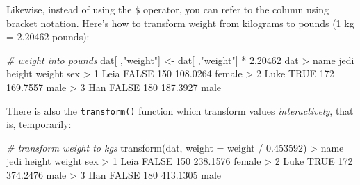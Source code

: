 \documentclass[
]{book}
\newenvironment{Shaded}{\begin{snugshade}}{\end{snugshade}}
\newcommand{\AttributeTok}[1]{\textcolor[rgb]{0.77,0.63,0.00}{#1}}
\newcommand{\CommentTok}[1]{\textcolor[rgb]{0.56,0.35,0.01}{\textit{#1}}}
\newcommand{\ConstantTok}[1]{\textcolor[rgb]{0.00,0.00,0.00}{#1}}
\newcommand{\DecValTok}[1]{\textcolor[rgb]{0.00,0.00,0.81}{#1}}
\newcommand{\FloatTok}[1]{\textcolor[rgb]{0.00,0.00,0.81}{#1}}
\newcommand{\FunctionTok}[1]{\textcolor[rgb]{0.00,0.00,0.00}{#1}}
\newcommand{\NormalTok}[1]{#1}
\newcommand{\OtherTok}[1]{\textcolor[rgb]{0.56,0.35,0.01}{#1}}
\newcommand{\SpecialCharTok}[1]{\textcolor[rgb]{0.00,0.00,0.00}{#1}}
\newcommand{\StringTok}[1]{\textcolor[rgb]{0.31,0.60,0.02}{#1}}
\begin{document}
\begin{Shaded}
\end{Shaded}

Likewise, instead of using the \texttt{\$} operator, you can refer to the column using
bracket notation. Here's how to transform weight from kilograms to pounds
(1 kg = 2.20462 pounds):

\begin{Shaded}
\begin{Highlighting}[]
\CommentTok{\# weight into pounds}
\NormalTok{dat[ ,}\StringTok{"weight"}\NormalTok{] }\OtherTok{\textless{}{-}}\NormalTok{ dat[ ,}\StringTok{"weight"}\NormalTok{] }\SpecialCharTok{*} \FloatTok{2.20462}
\NormalTok{dat}
\SpecialCharTok{\textgreater{}}\NormalTok{   name  jedi height   weight    sex}
\SpecialCharTok{\textgreater{}} \DecValTok{1}\NormalTok{ Leia }\ConstantTok{FALSE}    \DecValTok{150} \FloatTok{108.0264}\NormalTok{ female}
\SpecialCharTok{\textgreater{}} \DecValTok{2}\NormalTok{ Luke  }\ConstantTok{TRUE}    \DecValTok{172} \FloatTok{169.7557}\NormalTok{   male}
\SpecialCharTok{\textgreater{}} \DecValTok{3}\NormalTok{  Han }\ConstantTok{FALSE}    \DecValTok{180} \FloatTok{187.3927}\NormalTok{   male}
\end{Highlighting}
\end{Shaded}

There is also the \texttt{transform()} function which transform values \emph{interactively},
that is, temporarily:

\begin{Shaded}
\begin{Highlighting}[]
\CommentTok{\# transform weight to kgs}
\FunctionTok{transform}\NormalTok{(dat, }\AttributeTok{weight =}\NormalTok{ weight }\SpecialCharTok{/} \FloatTok{0.453592}\NormalTok{)}
\SpecialCharTok{\textgreater{}}\NormalTok{   name  jedi height   weight    sex}
\SpecialCharTok{\textgreater{}} \DecValTok{1}\NormalTok{ Leia }\ConstantTok{FALSE}    \DecValTok{150} \FloatTok{238.1576}\NormalTok{ female}
\SpecialCharTok{\textgreater{}} \DecValTok{2}\NormalTok{ Luke  }\ConstantTok{TRUE}    \DecValTok{172} \FloatTok{374.2476}\NormalTok{   male}
\SpecialCharTok{\textgreater{}} \DecValTok{3}\NormalTok{  Han }\ConstantTok{FALSE}    \DecValTok{180} \FloatTok{413.1305}\NormalTok{   male}
\end{Highlighting}
\end{Shaded}
\end{document}
